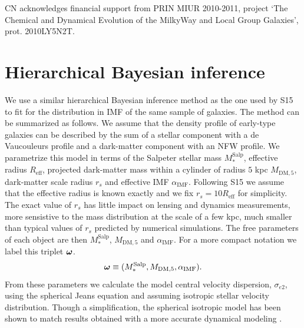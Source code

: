 \documentclass[usenatbib]{mnras}
\newcommand{\boldsymbol}[1]{\mbox{\boldmath{${#1}$}}}
\def\mdm{M_{\mathrm{DM}}}
\def\reff{R_{\mathrm{eff}}}
\def\msalp{M_*^{\mathrm{Salp}}}
\def\aimf{\alpha_{\mathrm{IMF}}}
\def\mdm{M_{\mathrm{DM},5}}
\def\sigmaee{\sigma_{e2}}
\def\indpar{\boldsymbol{\omega}}
\begin{document}
CN acknowledges financial support from PRIN MIUR 2010-2011,
project ‘The Chemical and Dynamical Evolution of the MilkyWay
and Local Group Galaxies’, prot. 2010LY5N2T.



%





\appendix
\onecolumn
\section{Hierarchical Bayesian inference}\label{sect:appendix}
We use a similar hierarchical Bayesian inference method as the one
used by S15 to fit for the distribution in IMF of the same sample of
galaxies. The method can be summarized as follows.  We assume that the
density profile of early-type galaxies can be described by the sum of
a stellar component with a de Vaucouleurs profile and a dark-matter
component with an NFW \citep{NFW97} profile.  We
parametrize this model in terms of the Salpeter stellar mass $\msalp$,
effective radius $\reff$, projected dark-matter mass within a cylinder
of radius $5$ kpc $\mdm$, dark-matter scale radius $r_s$ and effective
IMF $\aimf$.  Following S15 we assume that the effective radius is
known exactly and we fix $r_s = 10\reff$ for simplicity. The exact
value of $r_s$ has little impact on lensing and dynamics measurements,
more sensistive to the mass distribution at the scale of a few kpc,
much smaller than typical values of $r_s$ predicted by numerical
simulations.  The free parameters of each object are then $\msalp$,
$\mdm$ and $\aimf$. For a more compact notation we label this triplet $\indpar$.
\begin{equation}
\indpar \equiv(\msalp, \mdm, \aimf).
\end{equation}
From these parameters we calculate the model
central velocity dispersion, $\sigmaee$, using the spherical Jeans
equation and assuming isotropic stellar velocity distribution.
Though a simplification, the spherical isotropic model has been shown
to match results obtained with a more accurate dynamical modeling
\citep{Bar++11}.
\end{document}
